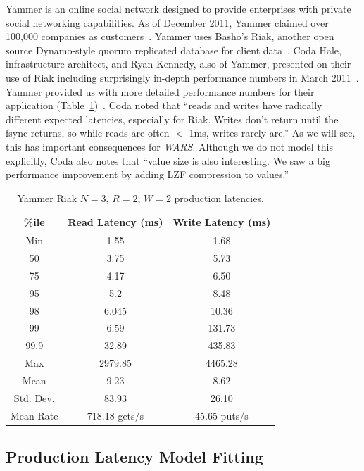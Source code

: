 \documentclass{vldb}
\begin{document}
Yammer is an online social network designed to provide enterprises
with private social networking capabilities.  As of December 2011,
Yammer claimed over 100,000 companies as customers~\cite{yammer}.
Yammer uses Basho's Riak, another open source Dynamo-style quorum
replicated database for client data~\cite{riak}.  Coda Hale,
infrastructure architect, and Ryan Kennedy, also of Yammer, presented
on their use of Riak including surprisingly in-depth performance
numbers in March 2011~\cite{riakyammer}.  Yammer provided us with more
detailed performance numbers for their application
(Table~\ref{table:yammer})~\cite{codapc}.  Coda noted that ``reads and
writes have radically different expected latencies, especially for
Riak. Writes don't return until the fsync returns, so while reads are
often $<$ 1ms, writes rarely are.''  As we will see, this has
important consequences for \textit{WARS}.  Although we do not model
this explicitly, Coda also notes that ``value size is also
interesting. We saw a big performance improvement by adding LZF
compression to values.''

\begin{table}
\centering
\begin{tabular}{|c|c|c|}
\hline
\%ile & Read Latency (ms) & Write Latency (ms)\\
\hline
Min & 1.55 & 1.68\\
50 & 3.75 & 5.73 \\
75 & 4.17 & 6.50\\
95 & 5.2 & 8.48\\
98 & 6.045 & 10.36 \\
99 & 6.59 & 131.73\\
99.9 & 32.89 & 435.83\\
Max & 2979.85 &  4465.28 \\
\hline
Mean & 9.23 & 8.62 \\
Std. Dev. & 83.93 & 26.10\\
\hline
Mean Rate & 718.18 gets/s & 45.65 puts/s\\
\hline
\end{tabular}
\caption{Yammer Riak $N$$=$$3$, $R$$=$$2$, $W$$=$$2$ production latencies.}
\label{table:yammer}
\end{table}

\subsection{Production Latency Model Fitting}
\end{document}

